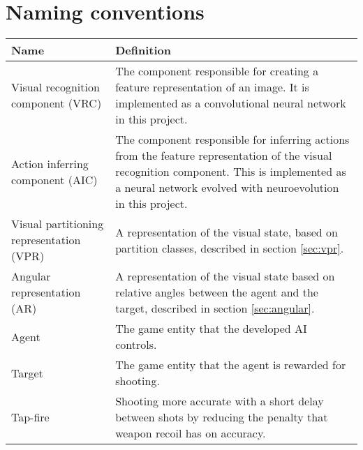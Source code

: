 
\section{Naming conventions}

\begin{table}[H]
\begin{center}

\begin{tabularx}{\textwidth}{ | l | X |}
		\hline
	
		\textbf{Name} & \textbf{Definition} \\ \hline
		Visual recognition component (VRC) & The component responsible for creating a feature representation of an image. It is implemented as a convolutional neural network in this project. \\ \hline
		Action inferring component (AIC) & The component responsible for inferring actions from the feature representation of the visual recognition component. This is implemented as a neural network evolved with neuroevolution in this project. \\ \hline
		Visual partitioning representation (VPR) & A representation of the visual state, based on partition classes, described in section \ref{sec:vpr}. \\ \hline
		
		Angular representation (AR) & A representation of the visual state based on relative angles between the agent and the target, described in section \ref{sec:angular}. \\ \hline
		Agent & The game entity that the developed AI controls. \\ \hline
		Target & The game entity that the agent is rewarded for shooting. \\ \hline
		
		Tap-fire & Shooting more accurate with a short delay between shots by reducing the penalty that weapon recoil has on accuracy. \\ \hline
		
\end{tabularx}
\end{center}
\label{tab:naming-conventions} 
\end{table}

\newpage